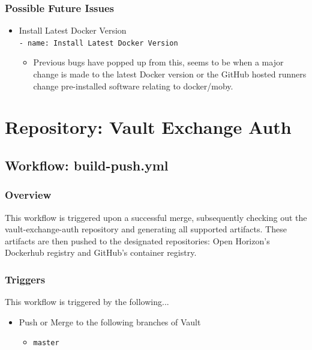 \documentclass[a4paper,11pt]{article}
\begin{document}
\subsubsection{Possible Future Issues}
\begin{itemize}
    \item Install Latest Docker Version\\\verb|- name: Install Latest Docker Version|
    \begin{itemize}
        \item Previous bugs have popped up from this, seems to be when a major change is made to the latest Docker version or the GitHub hosted runners change pre-installed software relating to docker/moby.
    \end{itemize}
\end{itemize}



\newpage
\section{Repository: Vault Exchange Auth}

\subsection{Workflow: build-push.yml}

\subsubsection{Overview}
This workflow is triggered upon a successful merge, subsequently checking out the vault-exchange-auth repository and generating all supported artifacts. These artifacts are then pushed to the designated repositories: Open Horizon's Dockerhub registry and GitHub's container registry.

\subsubsection{Triggers}
This workflow is triggered by the following...
\begin{itemize}
    \item Push or Merge to the following branches of Vault
    \begin{itemize}
        \item\verb|master|
    \end{itemize}
\end{itemize}
\end{document}
